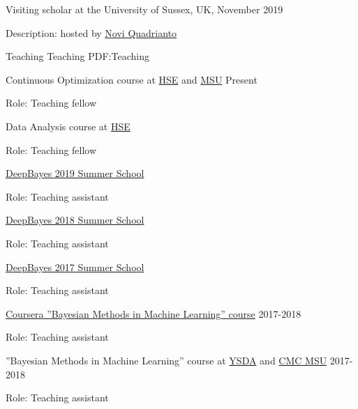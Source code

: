 \documentclass[letterpaper,MMMyyyy,nonstopmode]{simpleresumecv}
\begin{document}
\begin{Body}
\BulletItem Visiting scholar at the University of Sussex, UK, November 2019
\begin{Detail}
\Item
Description: hosted by \href{http://www.sussex.ac.uk/profiles/335583}{Novi Quadrianto}
\end{Detail}


\BigGap


\Section
{Teaching}
{Teaching}
{PDF:Teaching}

\BulletItem
Continuous Optimization course at \href{https://cs.hse.ru/en/}{HSE} and \href{https://cs.msu.ru/en}{MSU}
\hfill
Present
\begin{Detail}
\Item
Role: Teaching fellow
\end{Detail}

\BulletItem
Data Analysis course at \href{https://cs.hse.ru/en/}{HSE}
\hfill
{}
\begin{Detail}
\Item
Role: Teaching fellow
\end{Detail}

\BulletItem
\href{http://deepbayes.ru}{DeepBayes 2019 Summer School}
\hfill
{}
\begin{Detail}
\Item
Role: Teaching assistant
\end{Detail}

\BulletItem
\href{http://deepbayes.ru/2018/}{DeepBayes 2018 Summer School}
\hfill
{}
\begin{Detail}
\Item
Role: Teaching assistant
\end{Detail}

\BulletItem
\href{http://deepbayes.ru/2017/}{DeepBayes 2017 Summer School}
\hfill
{}
\begin{Detail}
\Item
Role: Teaching assistant
\end{Detail}

\Gap

\BulletItem
\href{https://www.coursera.org/learn/bayesian-methods-in-machine-learning}
{Coursera ”Bayesian Methods in Machine Learning” course}
\hfill
2017-2018
\begin{Detail}
\Item
Role: Teaching assistant
\end{Detail}

\Gap

\BulletItem
”Bayesian Methods in Machine Learning” course at \href{https://yandexdataschool.com}{YSDA}
and \href{https://cs.msu.ru/en}{CMC MSU}
\hfill
2017-2018
\begin{Detail}
\Item
Role: Teaching assistant
\end{Detail}


\end{Body}
\end{document}
